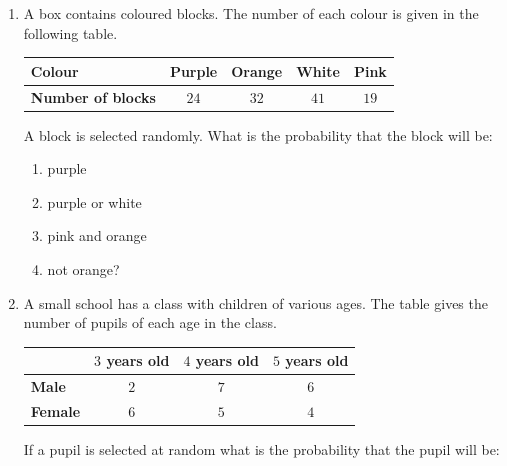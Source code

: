 \begin{exercises}{}
{
\begin{enumerate}[itemsep=6pt, label=\textbf{\arabic*}. ] 
  \item A box contains coloured blocks. The number of each colour is
    given in the following table.

    \begin{center}
      \begin{tabular}{|l|c|c|c|c|}
        \hline
        \textbf{Colour} & Purple & Orange & White & Pink \\ \hline
       
        \textbf{Number of blocks} & $24$ & $32$ & $41$ & $19$ \\ \hline
   
      \end{tabular}
    \end{center}
   A block is selected randomly. What is the probability that the block will be:
  \begin{enumerate}[noitemsep, label=\textbf{(\alph*)} ]
    \item purple
    \item purple or white
    \item pink and orange
    \item not orange?
    \end{enumerate}

  \item A small school has a class with children of various ages. The
    table gives the number of pupils of each age in the class.

    \begin{center}
      \begin{tabular}{|l|c|c|c|}
        \hline
               & $3$ years old & $4$ years old & $5$ years old \\\hline
   
        \textbf{Male}   & $2$ & $7$ & $6$ \\\hline
        \textbf{Female} & $6$ & $5$ & $4$ \\\hline
       
      \end{tabular}
    \end{center}

    If a pupil is selected at random what is the probability that the
    pupil will be:
  \begin{enumerate}[noitemsep, label=\textbf{(\alph*)} ]


\end{enumerate}
\end{enumerate}}
\end{exercises}
